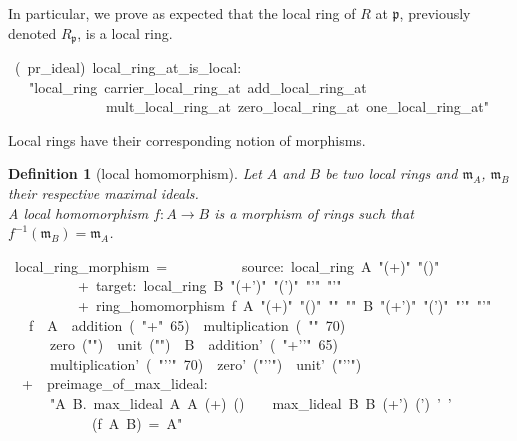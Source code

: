 \documentclass[12pt]{scrartcl}
\newtheorem{definition}[proposition]{Definition}
\begin{document}
In particular, we prove as expected that the local ring of $R$ at $\mathfrak{p}$, previously denoted $R_{\mathfrak{p}}$, is a local ring.

\begin{isabelle}
\ (\ pr\_ideal)\ local\_ring\_at\_is\_local:\isanewline
\ \ \ "local\_ring\ carrier\_local\_ring\_at\ add\_local\_ring\_at\ \isanewline
\ \ \ \ \ \ \ \ \ \ \ \ \ \ mult\_local\_ring\_at\ zero\_local\_ring\_at\ one\_local\_ring\_at"
\end{isabelle}

Local rings have their corresponding notion of morphisms. 

\begin{definition}[local homomorphism]
	Let $A$ and $B$ be two local rings and $\mathfrak{m}_A$, $\mathfrak{m}_B$ their respective maximal ideals. \\
	A local homomorphism $f: A \rightarrow B$ is a morphism of rings such that $f^{-1} (\mathfrak{m}_B) = \mathfrak{m}_A$. 
\end{definition}

\begin{isabelle}
\ local\_ring\_morphism\ =\isanewline
\ \ \ \ \ \ \ \ \ \ source:\ local\_ring\ A\ "(+)"\ "(\isasymcdot )"\ \isasymzero \ \isasymone \ \isanewline
\ \ \ \ \ \ \ \ \ \ +\ target:\ local\_ring\ B\ "(+')"\ "(\isasymcdot ')"\ "\isasymzero '"\ "\isasymone '"\isanewline
\ \ \ \ \ \ \ \ \ \ +\ ring\_homomorphism\ f\ A\ "(+)"\ "(\isasymcdot )"\ "\isasymzero "\ "\isasymone "\ B\ "(+')"\ "(\isasymcdot ')"\ "\isasymzero '"\ "\isasymone '"\isanewline
\ \ \ f\ \ A\ \ addition\ (\ "+"\ 65)\ \ multiplication\ (\ "\isasymcdot "\ 70)\ \isanewline
\ \ \ \ \ \ zero\ ("\isasymzero ")\ \ unit\ ("\isasymone ")\ \ B\ \ addition'\ (\ "+'{\kern0pt}'"\ 65)\ \isanewline
\ \ \ \ \ \ multiplication'\ (\ "\isasymcdot '{\kern0pt}'"\ 70)\ \ zero'\ ("\isasymzero '{\kern0pt}'")\ \ unit'\ ("\isasymone '{\kern0pt}'")\isanewline
\ \ +\ \ preimage\_of\_max\_lideal:\isanewline
\ \ \ \ \ \ "\isasymAnd \isasymww \isactrlsub A\ \isasymww \isactrlsub B.\ max\_lideal\ \isasymww \isactrlsub A\ A\ (+)\ (\isasymcdot )\ \isasymzero \ \isasymone \ \isasymLongrightarrow \ max\_lideal\ \isasymww \isactrlsub B\ B\ (+')\ (\isasymcdot ')\ \isasymzero '\ \isasymone '\isanewline
\ \ \ \ \ \ \ \ \ \ \ \isasymLongrightarrow \ (f\isactrlsup \isasyminverse \ A\ \isasymww \isactrlsub B)\ =\ \isasymww \isactrlsub A"
\end{isabelle}
\end{document}
